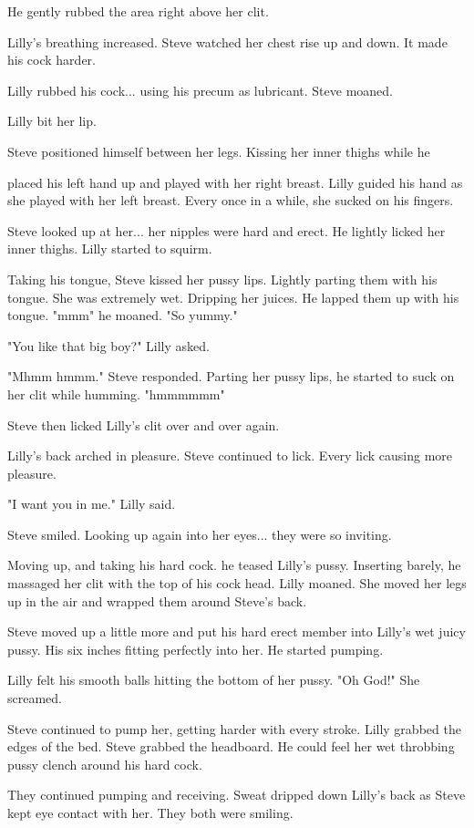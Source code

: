 He gently rubbed the area right above her clit.

Lilly's breathing increased. Steve watched her chest rise up and down. It made his cock harder.

Lilly rubbed his cock... using his precum as lubricant. Steve moaned.

Lilly bit her lip.

Steve positioned himself between her legs. Kissing her inner thighs while he

placed his left hand up and played with her right breast. Lilly guided his hand as she played with her left breast. Every once in a while, she sucked on his fingers.

Steve looked up at her... her nipples were hard and erect. He lightly licked her inner thighs. Lilly started to squirm.

Taking his tongue, Steve kissed her pussy lips. Lightly parting them with his tongue. She was extremely wet. Dripping her juices. He lapped them up with his tongue. "mmm" he moaned. "So yummy."

"You like that big boy?" Lilly asked.

"Mhmm hmmm." Steve responded. Parting her pussy lips, he started to suck on her clit while humming. "hmmmmmm"

Steve then licked Lilly's clit over and over again.

Lilly's back arched in pleasure. Steve continued to lick. Every lick causing more pleasure.

"I want you in me." Lilly said.

Steve smiled. Looking up again into her eyes... they were so inviting.

Moving up, and taking his hard cock. he teased Lilly's pussy. Inserting barely, he massaged her clit with the top of his cock head. Lilly moaned. She moved her legs up in the air and wrapped them around Steve's back.

Steve moved up a little more and put his hard erect member into Lilly's wet juicy pussy. His six inches fitting perfectly into her. He started pumping.

Lilly felt his smooth balls hitting the bottom of her pussy. "Oh God!" She screamed.

Steve continued to pump her, getting harder with every stroke. Lilly grabbed the edges of the bed. Steve grabbed the headboard. He could feel her wet throbbing pussy clench around his hard cock.

They continued pumping and receiving. Sweat dripped down Lilly's back as Steve kept eye contact with her. They both were smiling.

